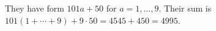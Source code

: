 They have form $101a+50$ for $a=1,\ldots,9$. Their sum is $101(1+\cdots+9)+9\cdot50=4545+450=\boxed{4995}$.
